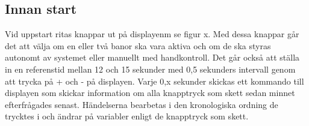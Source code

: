 \subsection{Innan start}

Vid uppstart ritas knappar ut på displayenm se figur x. Med dessa knappar går
det att välja om en eller två banor ska vara aktiva och om de ska styras
autonomt av systemet eller manuellt med handkontroll. Det går också att ställa
in en referenstid mellan 12 och 15 sekunder med 0,5 sekunders intervall genom
att trycka på + och - på displayen. Varje 0,x sekunder skickas ett kommando till
displayen som skickar information om alla knapptryck som skett sedan minnet
efterfrågades senast. Händelserna bearbetas i den kronologiska ordning de
trycktes i och ändrar på variabler enligt de knapptryck som skett.
